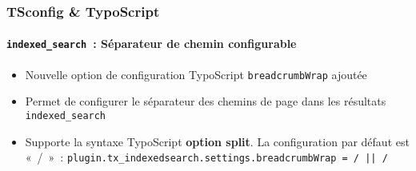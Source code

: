 \begin{frame}[fragile]
	\frametitle{TSconfig \& TypoScript}
	\framesubtitle{\texttt{indexed\_search}~: Séparateur de chemin configurable}

	\lstset{basicstyle=\tiny\ttfamily}

	\begin{itemize}

		\item Nouvelle option de configuration TypoScript \texttt{breadcrumbWrap} ajoutée

		\item Permet de configurer le séparateur des chemins de page dans les résultats \texttt{indexed\_search}

		\item Supporte la syntaxe TypoScript \textbf{option split}.\newline
			La configuration par défaut est «~/~»~:\newline
			\small
				\texttt{plugin.tx\_indexedsearch.settings.breadcrumbWrap = / || /}
			\normalsize

	\end{itemize}

\end{frame}

